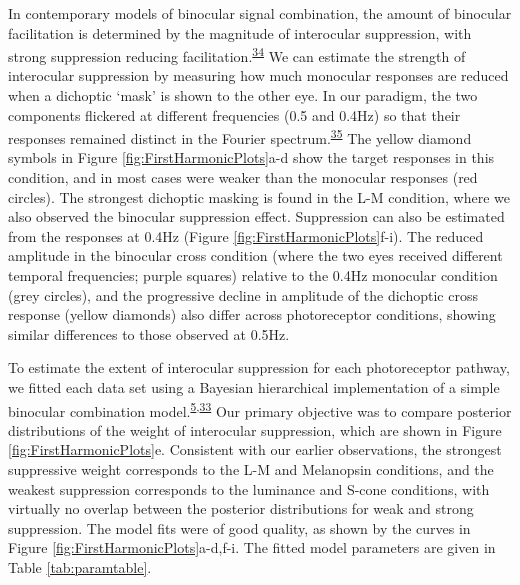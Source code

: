 \documentclass[
]{article}
\begin{document}
In contemporary models of binocular signal combination, the amount of binocular facilitation is determined by the magnitude of interocular suppression, with strong suppression reducing facilitation.\textsuperscript{\protect\hyperlink{ref-Kingdom2015}{34}} We can estimate the strength of interocular suppression by measuring how much monocular responses are reduced when a dichoptic `mask' is shown to the other eye. In our paradigm, the two components flickered at different frequencies (0.5 and 0.4Hz) so that their responses remained distinct in the Fourier spectrum.\textsuperscript{\protect\hyperlink{ref-Busse2009}{35}} The yellow diamond symbols in Figure \ref{fig:FirstHarmonicPlots}a-d show the target responses in this condition, and in most cases were weaker than the monocular responses (red circles). The strongest dichoptic masking is found in the L-M condition, where we also observed the binocular suppression effect. Suppression can also be estimated from the responses at 0.4Hz (Figure \ref{fig:FirstHarmonicPlots}f-i). The reduced amplitude in the binocular cross condition (where the two eyes received different temporal frequencies; purple squares) relative to the 0.4Hz monocular condition (grey circles), and the progressive decline in amplitude of the dichoptic cross response (yellow diamonds) also differ across photoreceptor conditions, showing similar differences to those observed at 0.5Hz.

To estimate the extent of interocular suppression for each photoreceptor pathway, we fitted each data set using a Bayesian hierarchical implementation of a simple binocular combination model.\textsuperscript{\protect\hyperlink{ref-Segala2023}{5},\protect\hyperlink{ref-Meese2006}{33}} Our primary objective was to compare posterior distributions of the weight of interocular suppression, which are shown in Figure \ref{fig:FirstHarmonicPlots}e. Consistent with our earlier observations, the strongest suppressive weight corresponds to the L-M and Melanopsin conditions, and the weakest suppression corresponds to the luminance and S-cone conditions, with virtually no overlap between the posterior distributions for weak and strong suppression. The model fits were of good quality, as shown by the curves in Figure \ref{fig:FirstHarmonicPlots}a-d,f-i. The fitted model parameters are given in Table \ref{tab:paramtable}.
\end{document}
